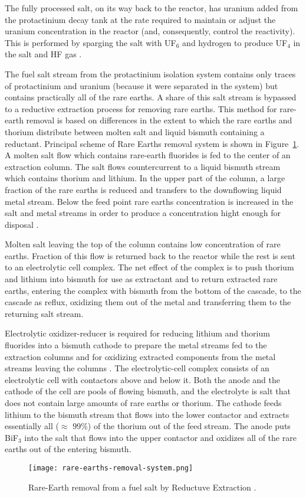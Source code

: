 The fully processed salt, on its way back to the reactor, has uranium added from the protactinium decay tank at the rate required to maintain or adjust the uranium concentration in the reactor (and, consequently, control the reactivity). This is performed by sparging the salt with UF$_6$ and hydrogen to produce UF$_4$ in the salt and HF gas \cite{robertson_conceptual_1971}.

The fuel salt stream from the protactinium isolation system contains only traces of protactinium and uranium (because it were separated in the system) but contains practically all of the rare earths. A share of this salt stream is bypassed to a reductive extraction process for removing rare earths. This method for rare-earth removal is based on differences in the extent to which the rare earths and thorium distribute between molten salt and liquid bismuth containing a reductant. Principal scheme of Rare Earths removal system is shown in Figure~\ref{fig:rare-earth-removal}. A molten salt flow which contains rare-earth fluorides is fed to the center of an extraction column. The salt flows countercurrent to a liquid bismuth stream which contains thorium and lithium. In the upper part of the column, a large fraction of the rare earths is reduced and transfers to the downflowing liquid metal stream. Below the feed point rare earths concentration is increased in the salt and metal streams in order to produce a concentration hight enough for disposal \cite{briggs_molten-salt_1969}.

Molten salt leaving the top of the column contains low concentration of rare earths. Fraction of this flow is returned back to the reactor while the rest is sent to an electrolytic cell complex. The net effect of the complex is to push thorium and lithium into bismuth for use as extractant and to return extracted rare earths, entering the complex with bismuth from the bottom of the cascade, to the cascade as reflux, oxidizing them out of the metal and transferring them to the returning salt stream.

Electrolytic oxidizer-reducer is required for reducing lithium and thorium fluorides into a bismuth cathode to prepare the metal streams fed to the extraction columns and for oxidizing extracted components from the metal streams leaving the columns \cite{mcneese_engineering_1971}. The electrolytic-cell complex consists of an electrolytic
cell with contactors above and below it. Both the anode and the cathode of the cell are pools of flowing bismuth, and the electrolyte is salt that does not contain large amounts of rare earths or thorium. The cathode feeds lithium to the bismuth stream that flows into the
lower contactor and extracts essentially all ($\approx$ 99\%) of the thorium out of the feed stream. The anode puts BiF$_3$ into the salt that flows into the upper contactor and oxidizes all of the rare earths out of the entering bismuth. 
\begin{figure}[htbp!]
  \centering
        \texttt{[image: rare-earths-removal-system.png]}
    \caption{Rare-Earth removal from a fuel salt by Reductuve Extraction \cite{briggs_molten-salt_1969}.}
    \label{fig:rare-earth-removal}
\end{figure}

